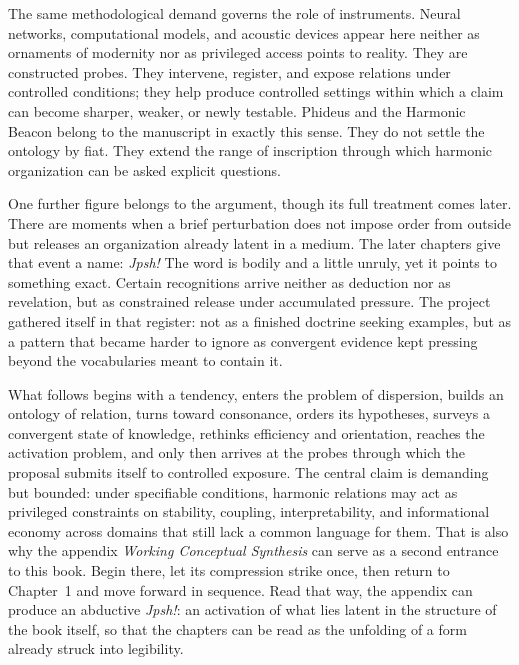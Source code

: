The same methodological demand governs the role of instruments. Neural networks, computational models, and acoustic devices appear here neither as ornaments of modernity nor as privileged access points to reality. They are constructed probes. They intervene, register, and expose relations under controlled conditions; they help produce controlled settings within which a claim can become sharper, weaker, or newly testable. Phideus and the Harmonic Beacon belong to the manuscript in exactly this sense. They do not settle the ontology by fiat. They extend the range of inscription through which harmonic organization can be asked explicit questions.

One further figure belongs to the argument, though its full treatment comes later. There are moments when a brief perturbation does not impose order from outside but releases an organization already latent in a medium. The later chapters give that event a name: \emph{Jpsh!} The word is bodily and a little unruly, yet it points to something exact. Certain recognitions arrive neither as deduction nor as revelation, but as constrained release under accumulated pressure. The project gathered itself in that register: not as a finished doctrine seeking examples, but as a pattern that became harder to ignore as convergent evidence kept pressing beyond the vocabularies meant to contain it.

What follows begins with a tendency, enters the problem of dispersion, builds an ontology of relation, turns toward consonance, orders its hypotheses, surveys a convergent state of knowledge, rethinks efficiency and orientation, reaches the activation problem, and only then arrives at the probes through which the proposal submits itself to controlled exposure. The central claim is demanding but bounded: under specifiable conditions, harmonic relations may act as privileged constraints on stability, coupling, interpretability, and informational economy across domains that still lack a common language for them. That is also why the appendix \emph{Working Conceptual Synthesis} can serve as a second entrance to this book. Begin there, let its compression strike once, then return to Chapter~1 and move forward in sequence. Read that way, the appendix can produce an abductive \emph{Jpsh!}: an activation of what lies latent in the structure of the book itself, so that the chapters can be read as the unfolding of a form already struck into legibility.
